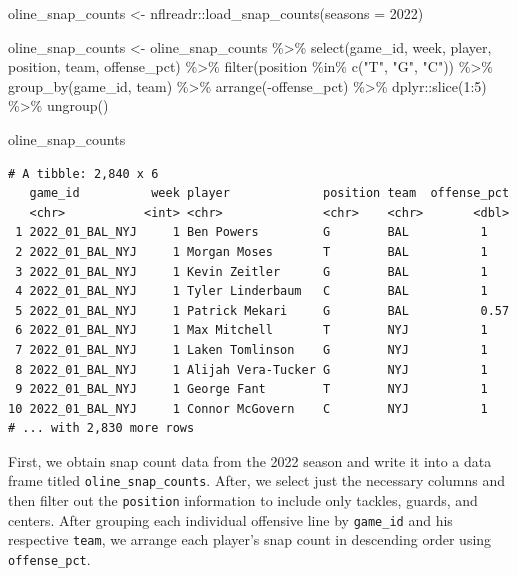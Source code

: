 \documentclass[
  letterpaper,
]{krantz}
\newenvironment{Shaded}{\begin{snugshade}}{\end{snugshade}}
\newcommand{\AttributeTok}[1]{\textcolor[rgb]{0.40,0.45,0.13}{#1}}
\newcommand{\DecValTok}[1]{\textcolor[rgb]{0.68,0.00,0.00}{#1}}
\newcommand{\FunctionTok}[1]{\textcolor[rgb]{0.28,0.35,0.67}{#1}}
\newcommand{\NormalTok}[1]{\textcolor[rgb]{0.00,0.23,0.31}{#1}}
\newcommand{\OtherTok}[1]{\textcolor[rgb]{0.00,0.23,0.31}{#1}}
\newcommand{\SpecialCharTok}[1]{\textcolor[rgb]{0.37,0.37,0.37}{#1}}
\newcommand{\StringTok}[1]{\textcolor[rgb]{0.13,0.47,0.30}{#1}}
\begin{document}
\begin{Shaded}
\begin{Highlighting}[]
\NormalTok{oline\_snap\_counts }\OtherTok{\textless{}{-}}\NormalTok{ nflreadr}\SpecialCharTok{::}\FunctionTok{load\_snap\_counts}\NormalTok{(}\AttributeTok{seasons =} \DecValTok{2022}\NormalTok{)}

\NormalTok{oline\_snap\_counts }\OtherTok{\textless{}{-}}\NormalTok{ oline\_snap\_counts }\SpecialCharTok{\%\textgreater{}\%}
  \FunctionTok{select}\NormalTok{(game\_id, week, player, position, team, offense\_pct) }\SpecialCharTok{\%\textgreater{}\%}
  \FunctionTok{filter}\NormalTok{(position }\SpecialCharTok{\%in\%} \FunctionTok{c}\NormalTok{(}\StringTok{"T"}\NormalTok{, }\StringTok{"G"}\NormalTok{, }\StringTok{"C"}\NormalTok{)) }\SpecialCharTok{\%\textgreater{}\%}
  \FunctionTok{group\_by}\NormalTok{(game\_id, team) }\SpecialCharTok{\%\textgreater{}\%}
  \FunctionTok{arrange}\NormalTok{(}\SpecialCharTok{{-}}\NormalTok{offense\_pct) }\SpecialCharTok{\%\textgreater{}\%}
\NormalTok{  dplyr}\SpecialCharTok{::}\FunctionTok{slice}\NormalTok{(}\DecValTok{1}\SpecialCharTok{:}\DecValTok{5}\NormalTok{) }\SpecialCharTok{\%\textgreater{}\%}
  \FunctionTok{ungroup}\NormalTok{()}

\NormalTok{oline\_snap\_counts}
\end{Highlighting}
\end{Shaded}

\begin{verbatim}
# A tibble: 2,840 x 6
   game_id          week player             position team  offense_pct
   <chr>           <int> <chr>              <chr>    <chr>       <dbl>
 1 2022_01_BAL_NYJ     1 Ben Powers         G        BAL          1   
 2 2022_01_BAL_NYJ     1 Morgan Moses       T        BAL          1   
 3 2022_01_BAL_NYJ     1 Kevin Zeitler      G        BAL          1   
 4 2022_01_BAL_NYJ     1 Tyler Linderbaum   C        BAL          1   
 5 2022_01_BAL_NYJ     1 Patrick Mekari     G        BAL          0.57
 6 2022_01_BAL_NYJ     1 Max Mitchell       T        NYJ          1   
 7 2022_01_BAL_NYJ     1 Laken Tomlinson    G        NYJ          1   
 8 2022_01_BAL_NYJ     1 Alijah Vera-Tucker G        NYJ          1   
 9 2022_01_BAL_NYJ     1 George Fant        T        NYJ          1   
10 2022_01_BAL_NYJ     1 Connor McGovern    C        NYJ          1   
# ... with 2,830 more rows
\end{verbatim}

First, we obtain snap count data from the 2022 season and write it into
a data frame titled \texttt{oline\_snap\_counts}. After, we select just
the necessary columns and then filter out the \texttt{position}
information to include only tackles, guards, and centers. After grouping
each individual offensive line by \texttt{game\_id} and his respective
\texttt{team}, we arrange each player's snap count in descending order
using \texttt{offense\_pct}.
\end{document}
